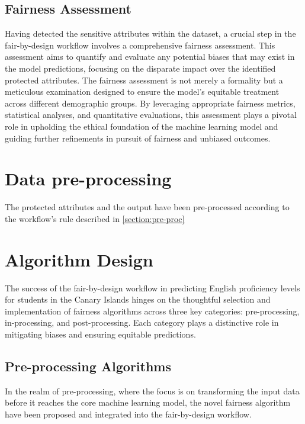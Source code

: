 \documentclass[12pt,a4paper,openright,twoside]{book}
\begin{document}
\subsection{Fairness Assessment}

Having detected the sensitive attributes within the dataset, a crucial step in the fair-by-design workflow involves a comprehensive fairness assessment. This assessment aims to quantify and evaluate any potential biases that may exist in the model predictions, focusing on the disparate impact over the identified protected attributes. The fairness assessment is not merely a formality but a meticulous examination designed to ensure the model's equitable treatment across different demographic groups. By leveraging appropriate fairness metrics, statistical analyses, and quantitative evaluations, this assessment plays a pivotal role in upholding the ethical foundation of the machine learning model and guiding further refinements in pursuit of fairness and unbiased outcomes.

\section{Data pre-processing}

The protected attributes and the output have been pre-processed according to the workflow's rule described in \cref{section:pre-proc}

\section{Algorithm Design}

The success of the fair-by-design workflow in predicting English proficiency levels for students in the Canary Islands hinges on the thoughtful selection and implementation of fairness algorithms across three key categories: pre-processing, in-processing, and post-processing. Each category plays a distinctive role in mitigating biases and ensuring equitable predictions.

\subsection{Pre-processing Algorithms}

In the realm of pre-processing, where the focus is on transforming the input data before it reaches the core machine learning model, the novel fairness algorithm have been proposed and integrated into the fair-by-design workflow.
\end{document}
